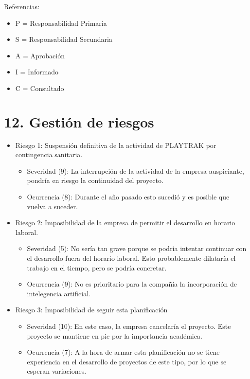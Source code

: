 \documentclass[11pt]{charter}
\begin{document}
{\footnotesize
Referencias:
\begin{itemize}
	\item P = Responsabilidad Primaria
	\item S = Responsabilidad Secundaria
	\item A = Aprobación
	\item I = Informado
	\item C = Consultado
\end{itemize}
} %

\section{12. Gestión de riesgos}
\label{sec:riesgos}

\begin{itemize}
  \item Riesgo 1: Suspensión definitiva de la actividad de PLAYTRAK por contingencia sanitaria.
  \begin{itemize}
    \item Severidad (9): La interrupción de la actividad de la empresa auspiciante, pondría en riesgo la 
    continuidad del proyecto.
    \item Ocurrencia (8): Durante el año pasado esto sucedió y es posible que vuelva a suceder.
  \end{itemize}
\end{itemize}

\begin{itemize}
  \item Riesgo 2: Imposibilidad de la empresa de permitir el desarrollo en horario laboral.
  \begin{itemize}
    \item Severidad (5): No sería tan grave porque se podría intentar continuar con el desarrollo fuera del 
    horario laboral. Esto probablemente dilataría el trabajo en el tiempo, pero se podría concretar.
    \item Ocurrencia (9): No es prioritario para la compañía la incorporación de intelegencia artificial.
  \end{itemize}
\end{itemize}

\begin{itemize}
  \item Riesgo 3: Imposibilidad de seguir esta planificación
  \begin{itemize}
    \item Severidad (10): En este caso, la empresa cancelaría el proyecto. Este proyecto se mantiene en pie por 
    la importancia académica.
    \item Ocurrencia (7): A la hora de armar esta planificación no se tiene experiencia en el desarrollo
    de proyectos de este tipo, por lo que se esperan variaciones.
  \end{itemize}
\end{itemize}
\end{document}
